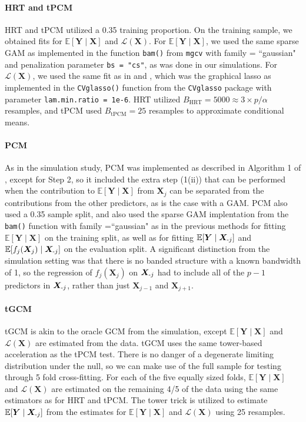 \documentclass[12pt]{article}
\theoremstyle{definition}
\theoremstyle{remark}
\newcommand{\E}{\mathbb E}								%
\newcommand{\prx}{\bm X}								%
\newcommand{\pry}{{\bm Y}}								%
\newcommand{\law}{\mathcal L}							%
\newcommand{\minus}{\textnormal{-}} 						    %
\begin{document}
\paragraph{HRT and tPCM}
HRT and tPCM utilized a 0.35 training proportion. On the training sample, we obtained fits for $\E[\pry \mid \prx]$ and $\law(\prx)$. For $\E[\pry \mid \prx]$, we used the same sparse GAM as implemented in the function \texttt{bam()} from \texttt{mgcv} with family = ``gaussian" and penalization parameter \verb|bs = "cs"|, as was done in our simulations. For $\mathcal{L}(\prx)$, we used the same fit as in \citet{Liu2020} and \citet{Li2021c}, which was the graphical lasso as implemented in the \texttt{CVglasso()} function from the \texttt{CVglasso} package with parameter \texttt{lam.min.ratio = 1e-6}. HRT utilized $B_{\text{HRT}} = 5000 \approx 3 \times p / \alpha$ resamples, and tPCM used $B_{\text{tPCM}} = 25$ resamples to approximate conditional means. 

\paragraph{PCM}
As in the simulation study, PCM was implemented as described in Algorithm 1 of \citet{Lundborg2022a}, except for Step 2, so it included the extra step (1(ii)) that can be performed when the contribution to $\E[\pry \mid \prx]$ from $\prx_j$ can be separated from the contributions from the other predictors, as is the case with a GAM. PCM also used a 0.35 sample split, and also used the sparse GAM implentation from the \texttt{bam()} function with family =``gaussian" as in the previous methods for fitting $\E[\pry \mid \prx]$ on the training split, as well as for fitting $\E[\pry \mid \prx_{\minus j}]$ and $\E[f_j(\prx_j) \mid \prx_{\minus j}]$ on the evaluation split. A significant distinction from the simulation setting was that there is no banded structure with a known bandwidth of 1, so the regression of $f_j(\prx_j)$ on $\prx_{\minus j}$ had to include all of the $p - 1$ predictors in $\prx_{\minus j}$, rather than just $\prx_{j-1}$ and $\prx_{j+1}$. 

\paragraph{tGCM}
tGCM is akin to the oracle GCM from the simulation, except $\E[\pry \mid \prx]$ and $\law(\prx)$ are estimated from the data. tGCM uses the same tower-based acceleration as the tPCM test. There is no danger of a degenerate limiting distribution under the null, so we can make use of the full sample for testing through 5 fold cross-fitting. For each of the five equally sized folds, $\E[\pry \mid \prx]$ and $\law(\prx)$ are estimated on the remaining 4/5 of the data using the same estimators as for HRT and tPCM. The tower trick is utilized to estimate $\E[\pry \mid \prx_{\minus j}]$ from the estimates for $\E[\pry \mid \prx]$ and $\law(\prx)$ using 25 resamples.
\end{document}
